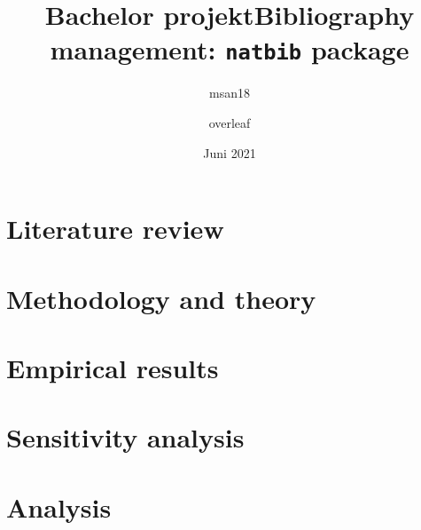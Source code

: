 \documentclass[danish ,a4paper,12pt]{article}
\title{Bachelor projekt}
\author{msan18 }
\date{Juni 2021}
\title{Bibliography management: \texttt{natbib} package}
\author{overleaf}
\date{}
\begin{document}
\linespread{1.5}

\frontmatter






\tableofcontents*	
\newpage


\renewcommand{\cleardoublepage}{\newpage}
\mainmatter


\vspace{1.5 cm}
\selectfont





\section{Literature review} \label{lit_rev}



\section{Methodology and theory} \label{sec:method}



\section{Empirical results} \label{sec:analysis}



\section{Sensitivity analysis} \label{sec:sensitivity}



\section{Analysis} \label{results}

\end{document}
